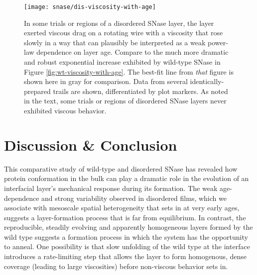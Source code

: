   \begin{figure}
    \centering
    \texttt{[image: snase/dis-viscosity-with-age]}
    \caption{\label{fig:dis-viscosity-with-age}In some trials or regions of a disordered SNase layer, the layer exerted viscous drag on a rotating wire with a viscosity that rose slowly in a way that can plausibly be interpreted as a weak power-law dependence on layer age. Compare to the much more dramatic and robust exponential increase exhibited by wild-type SNase in Figure \ref{fig:wt-viscosity-with-age}. The best-fit line from \emph{that} figure is shown here in gray for comparison. Data from several identically-prepared trails are shown, differentiated by plot markers. As noted in the text, some trials or regions of disordered SNase layers never exhibited viscous behavior.}
    \end{figure}


\section{Discussion \& Conclusion}

This comparative study of wild-type and disordered SNase has revealed how protein conformation in the bulk can play a dramatic role in the evolution of an interfacial layer's mechanical response during its formation. The weak age-dependence and strong variability observed in disordered films, which we associate with mesoscale spatial heterogeneity that sets in at very early ages, suggests a layer-formation process that is far from equilibrium. In contrast, the reproducible, steadily evolving and apparently homogeneous layers formed by the wild type suggests a formation process in which the system has the opportunity to anneal. One possibility is that slow unfolding of the wild type at the interface introduces a rate-limiting step that allows the layer to form homogenous, dense coverage (leading to large viscosities) before non-viscous behavior sets in.
